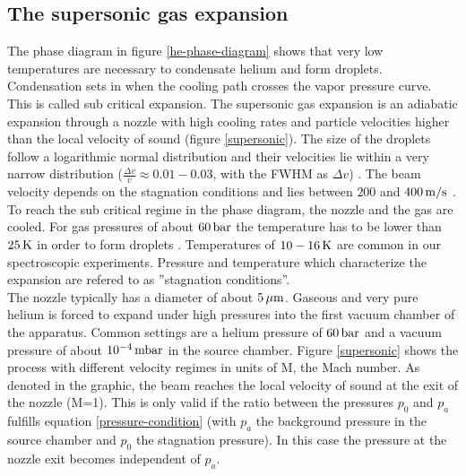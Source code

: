 \documentclass[parskip,12pt,headsepline,a4paper] {scrbook}
\begin{document}
\subsection{The supersonic gas expansion}
\vspace{-1\baselineskip}
The phase diagram in figure \ref{he-phase-diagram} shows that very low temperatures are necessary to condensate helium and form droplets. Condensation sets in when the cooling path crosses the vapor pressure curve. This is called sub critical expansion. The supersonic gas expansion is an adiabatic expansion through a nozzle with high cooling rates and particle velocities higher than the local velocity of sound (figure \ref{supersonic}). The size of the droplets follow a logarithmic normal distribution and their velocities lie within a very narrow distribution ($\frac{\Delta v}{v} \approx 0.01-0.03$, with the FWHM as $\Delta v$) \cite{scoles} \cite{scoles2}. The beam velocity depends on the stagnation conditions and lies between $200$ and $\unit[400]{m/s}$ \cite{toennis}.\\
To reach the sub critical regime in the phase diagram, the nozzle and the gas are cooled. For gas pressures of about $\unit[60]{bar}$ the temperature has to be lower than $\unit[25]{K}$ in order to form droplets \cite{nanolab}. Temperatures of $\unit[10-16]{K}$ are common in our spectroscopic experiments. Pressure and temperature which characterize the expansion are refered to as ''stagnation conditions''. \\
The nozzle typically has a diameter of about $\unit[5]{\mu m}$. Gaseous and very pure helium is forced to expand under high pressures into the first vacuum chamber of the apparatus. Common settings are a helium pressure of $\unit[60]{bar}$ and a vacuum pressure of about $\unit[10^{-4}]{mbar}$ in the source chamber. Figure \ref{supersonic} shows the process with different velocity regimes in units of M, the Mach number. As denoted in the graphic, the beam reaches the local velocity of sound at the exit of the nozzle (M=1). This is only valid if the ratio between the pressures $p_0$ and $p_a$ fulfills equation \ref{pressure-condition} (with $p_a$ the background pressure in the source chamber and $p_0$ the stagnation pressure). In this case the pressure at the nozzle exit becomes independent of $p_a$.
\end{document}
